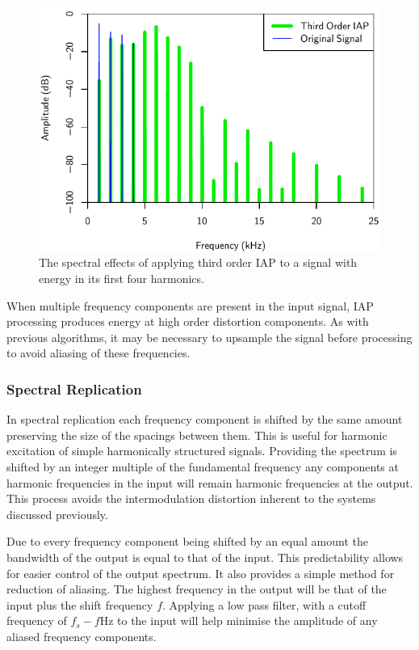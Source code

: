 			\begin{figure}[h!]
				\centering
				\includegraphics{chapter5/Images/IAP3Spectra.pdf}
				\caption{The spectral effects of applying third order IAP to a signal with energy in its 
				         first four harmonics.}
				\label{fig:IAP3Spectra}
			\end{figure}

			When multiple frequency components are present in the input signal, IAP processing produces energy
			at high order distortion components. As with previous algorithms, it may be necessary to upsample
			the signal before processing to avoid aliasing of these frequencies.

		\subsubsection*{Spectral Replication}
			In spectral replication each frequency component is shifted by the same amount preserving the size
			of the spacings between them. This is useful for harmonic excitation of simple harmonically
			structured signals. Providing the spectrum is shifted by an integer multiple of the fundamental
			frequency any components at harmonic frequencies in the input will remain harmonic frequencies at
			the output. This process avoids the intermodulation distortion inherent to the systems discussed
			previously. 

			Due to every frequency component being shifted by an equal amount the bandwidth of the output is
			equal to that of the input. This predictability allows for easier control of the output spectrum.
			It also provides a simple method for reduction of aliasing. The highest frequency in the output
			will be that of the input plus the shift frequency $f$. Applying a low pass filter, with a cutoff
			frequency of $f_{s} - f$Hz to the input will help minimise the amplitude of any aliased
			frequency components.


